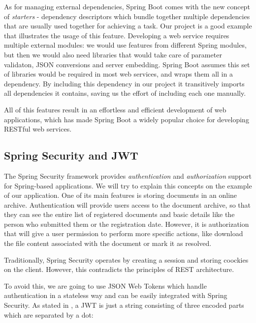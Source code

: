 As for managing external dependencies, Spring Boot comes with the new concept of \textit{starters} - dependency descriptors which bundle together multiple dependencies that are usually used together for achieving a task. Our project is a good example that illustrates the usage of this feature. Developing a web service requires multiple external modules: we would use features from different Spring modules, but then we would also need libraries that would take care of parameter validaton, JSON conversions and server embedding. Spring Boot assumes this set of libraries would be required in most web services, and wraps them all in a  dependency. By including this dependency in our project it transitively imports all dependencies it contains, saving us the effort of including each one manually.

All of this features result in an effortless and efficient development of web applications, which has made Spring Boot a widely popular choice for developing RESTful web services.


\subsection{Spring Security and JWT}
\label{subsection:springSecurityAndJWT}

The Spring Security framework provides \textit{authentication} and \textit{authorization} support for Spring-based applications. We will try to explain this concepts on the example of our application. One of its main features is storing documents in an online archive. Authentication will provide users access to the document archive, so that they can see the entire list of registered documents and basic details like the person who submitted them or the registration date. However, it is authorization that will give a user permission to perform more specific actions, like download the file content associated with the document or mark it as resolved.

Traditionally, Spring Security operates by creating a session and storing coockies on the client. However, this contradicts the principles of REST architecture.

To avoid this, we are going to use JSON Web Tokens which handle authentication in a stateless way and can be easily integrated with Spring Security. As stated in \cite{buildingRESTfulWebServicesWithSpring}, a JWT is just a string consisting of three encoded parts which are separated by a dot:

